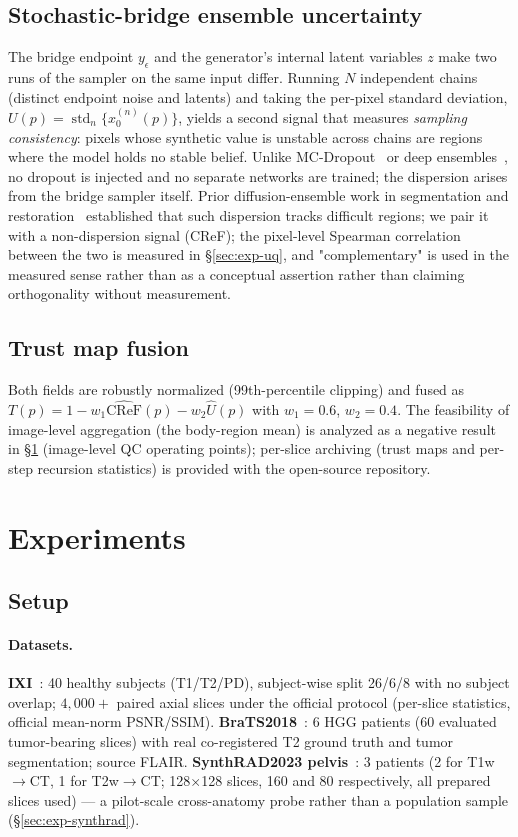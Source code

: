 \documentclass[11pt]{article}
\begin{document}
\subsection{Stochastic-bridge ensemble uncertainty}
The bridge endpoint $y_\epsilon$ and the generator's internal latent variables
$z$ make two runs of the sampler on the same input differ. Running
$N$ independent chains (distinct endpoint noise and latents) and taking the
per-pixel standard deviation,
$U(p)=\operatorname{std}_{n}\{x_0^{(n)}(p)\}$, yields a second signal that
measures \emph{sampling consistency}: pixels whose synthetic value is unstable
across chains are regions where the model holds no stable belief. Unlike
MC-Dropout~\cite{gal2016mcdropout} or deep
ensembles~\cite{lakshminarayanan2017ensembles}, no dropout is injected and no
separate networks are trained; the dispersion arises from the bridge sampler
itself. Prior diffusion-ensemble work in segmentation and
restoration~\cite{wolleb2022diffusionensembles,osuna2024microscopy} established
that such dispersion tracks difficult regions; we pair it with a non-dispersion signal (CReF); the pixel-level Spearman
correlation between the two is measured in \S\ref{sec:exp-uq}, and
"complementary" is used in the measured sense rather than as a conceptual
assertion rather than claiming orthogonality without measurement.

\subsection{Trust map fusion}
Both fields are robustly normalized (99th-percentile clipping) and fused as
$T(p)=1-w_1\widehat{\mathrm{CReF}}(p)-w_2\widehat{U}(p)$ with
$w_1{=}0.6$, $w_2{=}0.4$. The feasibility of image-level aggregation (the body-region mean) is
analyzed as a negative result in \S\ref{sec:exp} (image-level QC operating
points); per-slice archiving (trust maps and per-step recursion statistics)
is provided with the open-source repository.

\section{Experiments}
\label{sec:exp}

\subsection{Setup}
\paragraph{Datasets.}
\textbf{IXI}~\cite{ixi_dataset}: 40 healthy subjects (T1/T2/PD), subject-wise
split 26/6/8 with no subject overlap; $4{,}000{+}$ paired axial slices under
the official protocol (per-slice statistics, official mean-norm PSNR/SSIM).
\textbf{BraTS2018}~\cite{menze2015brats}: 6 HGG patients (60 evaluated
tumor-bearing slices) with real co-registered T2 ground truth and tumor
segmentation; source FLAIR. \textbf{SynthRAD2023 pelvis}~\cite{thummerer2023synthrad}:
3 patients (2 for T1w$\to$CT, 1 for T2w$\to$CT; 128$\times$128 slices, 160 and
80 respectively, all prepared slices used) --- a pilot-scale cross-anatomy
probe rather than a population sample (\S\ref{sec:exp-synthrad}).
\end{document}
